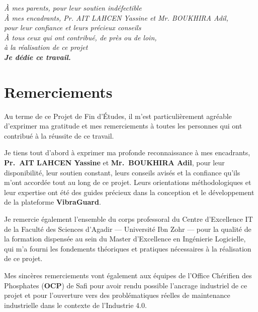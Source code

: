 \documentclass[12pt, a4paper, oneside]{report}
\newcommand{\projectname}{\textbf{VibraGuard}}
\begin{document}




\setcounter{page}{1}

\newpage
\thispagestyle{empty}
\vspace*{5cm}
\begin{flushright}
  \textit{À mes parents, pour leur soutien indéfectible}\\[0.5cm]
  \textit{À mes encadrants, Pr. AIT LAHCEN Yassine et Mr. BOUKHIRA Adil,}\\
  \textit{pour leur confiance et leurs précieux conseils}\\[0.5cm]
  \textit{À tous ceux qui ont contribué, de près ou de loin,}\\
  \textit{à la réalisation de ce projet}\\[1cm]
  \textit{\textbf{Je dédie ce travail.}}
\end{flushright}
\newpage

\chapter*{Remerciements}

Au terme de ce Projet de Fin d'Études, il m'est particulièrement agréable d'exprimer ma
gratitude et mes remerciements à toutes les personnes qui ont contribué à la réussite de ce
travail.

Je tiens tout d'abord à exprimer ma profonde reconnaissance à mes encadrants,
\textbf{Pr.~AIT LAHCEN Yassine} et \textbf{Mr.~BOUKHIRA Adil}, pour leur disponibilité,
leur soutien constant, leurs conseils avisés et la confiance qu'ils m'ont accordée tout au
long de ce projet. Leurs orientations méthodologiques et leur expertise ont été des guides
précieux dans la conception et le développement de la plateforme \projectname{}.

Je remercie également l'ensemble du corps professoral du Centre d'Excellence IT de la
Faculté des Sciences d'Agadir --- Université Ibn Zohr --- pour la qualité de la formation
dispensée au sein du Master d'Excellence en Ingénierie Logicielle, qui m'a fourni les
fondements théoriques et pratiques nécessaires à la réalisation de ce projet.

Mes sincères remerciements vont également aux équipes de l'Office Chérifien des Phosphates
(\textbf{OCP}) de Safi pour avoir rendu possible l'ancrage industriel de ce projet et pour
l'ouverture vers des problématiques réelles de maintenance industrielle dans le contexte de
l'Industrie 4.0.
\end{document}
